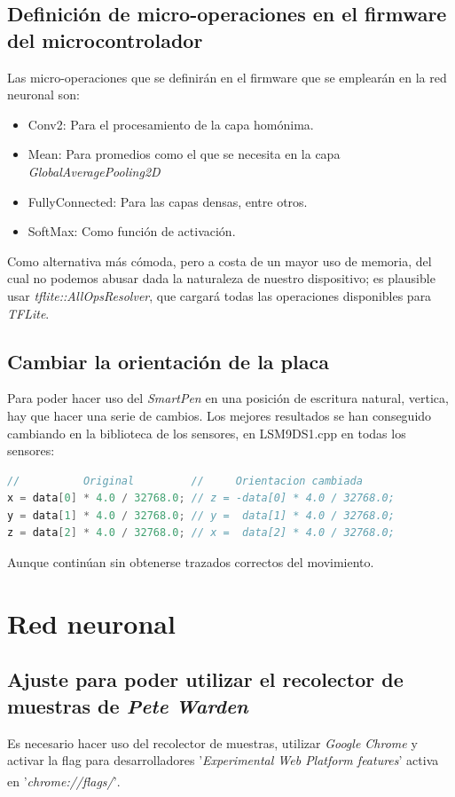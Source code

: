 \begin{appendices}
\section{Definición de micro-operaciones en el firmware del
microcontrolador\label{firmwMO}}
Las micro-operaciones que se definirán en el firmware que
se emplearán en la red neuronal son:
\begin{itemize}
    \itemsep0em 
    \item Conv2: Para el procesamiento de la capa homónima.
    \item Mean: Para promedios como el que se necesita en la capa \textit{GlobalAveragePooling2D}
    \item FullyConnected: Para las capas densas, entre otros.
    \item SoftMax: Como función de activación.
\end{itemize}

Como alternativa más cómoda, pero a costa de un mayor uso de memoria,
del cual no podemos abusar dada la naturaleza de nuestro dispositivo;
es plausible usar \textit{tflite::AllOpsResolver}, que cargará todas las
operaciones disponibles para \textit{TFLite}.


\section{Cambiar la orientación de la placa}
Para poder hacer uso del \textit{SmartPen} en una posición de escritura natural,
vertica, hay que hacer una serie de cambios.
Los mejores resultados se han conseguido cambiando en la biblioteca de los sensores,
en LSM9DS1.cpp en todas los sensores:
\begin{lstlisting}[firstnumber=121,language=c++,title=Fragmento
    de \textit{LSM9DS1.cpp} de la librería homónima]
//          Original         //     Orientacion cambiada
x = data[0] * 4.0 / 32768.0; // z = -data[0] * 4.0 / 32768.0;
y = data[1] * 4.0 / 32768.0; // y =  data[1] * 4.0 / 32768.0;
z = data[2] * 4.0 / 32768.0; // x =  data[2] * 4.0 / 32768.0;
\end{lstlisting}

Aunque continúan sin obtenerse trazados correctos del movimiento.


\chapter{Red neuronal}
\section{Ajuste para poder utilizar el recolector de muestras de \textit{Pete Warden}\label{PWchrome}}
Es necesario hacer uso del recolector de muestras, utilizar \textit{Google Chrome}
y activar la flag para desarrolladores '\textit{Experimental Web Platform features}'
activa en '\textit{chrome://flags/}'\textsuperscript{\cite{petewardenmw}}.



\end{appendices}
